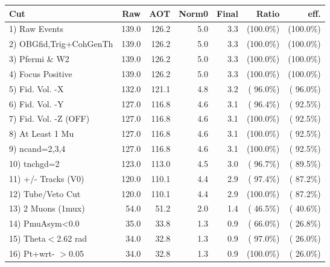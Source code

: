  \begin{table}[h!]\centering
 \begin{tabular}{||l||r|r|r|r|r|r||}
 \hline
 \hline
 Cut & Raw & AOT & Norm0 & Final & Ratio & eff.       \\
 \hline
  1) Raw Events           &        139.0 &        126.2 &          5.0 &          3.3 & (100.0\%) & (100.0\%) \\
  2) OBGfid,Trig+CohGenTh &        139.0 &        126.2 &          5.0 &          3.3 & (100.0\%) & (100.0\%) \\
  3) Pfermi \& W2         &        139.0 &        126.2 &          5.0 &          3.3 & (100.0\%) & (100.0\%) \\
  4) Focus Positive       &        139.0 &        126.2 &          5.0 &          3.3 & (100.0\%) & (100.0\%) \\
  5) Fid. Vol. -X         &        132.0 &        121.1 &          4.8 &          3.2 & ( 96.0\%) & ( 96.0\%) \\
  6) Fid. Vol. -Y         &        127.0 &        116.8 &          4.6 &          3.1 & ( 96.4\%) & ( 92.5\%) \\
  7) Fid. Vol. -Z (OFF)   &        127.0 &        116.8 &          4.6 &          3.1 & (100.0\%) & ( 92.5\%) \\
  8) At Least 1 Mu        &        127.0 &        116.8 &          4.6 &          3.1 & (100.0\%) & ( 92.5\%) \\
  9) ncand=2,3,4          &        127.0 &        116.8 &          4.6 &          3.1 & (100.0\%) & ( 92.5\%) \\
 10) tnchgd=2             &        123.0 &        113.0 &          4.5 &          3.0 & ( 96.7\%) & ( 89.5\%) \\
 11) +/- Tracks (V0)      &        120.0 &        110.1 &          4.4 &          2.9 & ( 97.4\%) & ( 87.2\%) \\
 12) Tube/Veto Cut        &        120.0 &        110.1 &          4.4 &          2.9 & (100.0\%) & ( 87.2\%) \\
 13) 2 Muons (1mux)       &         54.0 &         51.2 &          2.0 &          1.4 & ( 46.5\%) & ( 40.6\%) \\
 14) PmuAsym<0.0          &         35.0 &         33.8 &          1.3 &          0.9 & ( 66.0\%) & ( 26.8\%) \\
 15) Theta$<$2.62 rad     &         34.0 &         32.8 &          1.3 &          0.9 & ( 97.0\%) & ( 26.0\%) \\
 16) Pt+wrt- $>$0.05      &         34.0 &         32.8 &          1.3 &          0.9 & (100.0\%) & ( 26.0\%) \\

\end{tabular}
\end{table}
